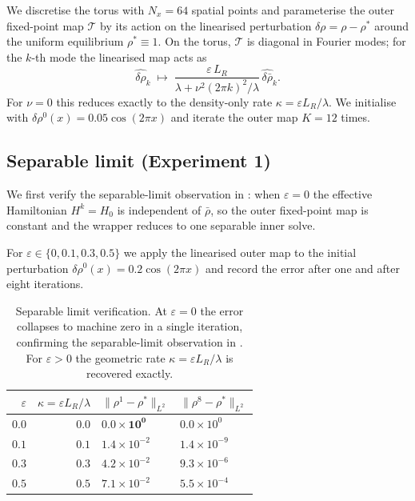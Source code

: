 We discretise the torus with $N_x = 64$ spatial points and parameterise the
outer fixed-point map $\mathcal{T}$ by its action on the linearised
perturbation $\delta\rho = \rho - \rho^*$ around the uniform equilibrium
$\rho^* \equiv 1$.
On the torus, $\mathcal{T}$ is diagonal in Fourier modes; for the $k$-th
mode the linearised map acts as
\[
  \widehat{\delta\rho}_k \;\longmapsto\;
  \frac{\varepsilon\, L_R}{\lambda + \nu^2 (2\pi k)^2/\lambda}\,
  \widehat{\delta\bar\rho}_k.
\]
For $\nu = 0$ this reduces exactly to the density-only rate
$\kappa = \varepsilon L_R/\lambda$.
We initialise with $\delta\rho^0(x) = 0.05\cos(2\pi x)$ and iterate
the outer map $K=12$ times.

\subsection{Separable limit (Experiment 1)}

We first verify the separable-limit observation in : when
$\varepsilon = 0$ the effective Hamiltonian $H^k = H_0$ is independent
of $\bar\rho$, so the outer fixed-point map is constant and the wrapper
reduces to one separable inner solve.

For $\varepsilon \in \{0, 0.1, 0.3, 0.5\}$ we apply the linearised outer
map to the initial perturbation $\delta\rho^0(x) = 0.2\cos(2\pi x)$
and record the error after one and after eight iterations.

\begin{table}[h]
\centering
\begin{tabular}{rrll}
\toprule
$\varepsilon$ & $\kappa = \varepsilon L_R/\lambda$ &
$\|\rho^1-\rho^*\|_{L^2}$ & $\|\rho^8-\rho^*\|_{L^2}$ \\
\midrule
$0.0$ & $0.0$ & $\mathbf{0.0\times 10^0}$ & $0.0\times 10^0$ \\
$0.1$ & $0.1$ & $1.4\times 10^{-2}$        & $1.4\times 10^{-9}$ \\
$0.3$ & $0.3$ & $4.2\times 10^{-2}$        & $9.3\times 10^{-6}$ \\
$0.5$ & $0.5$ & $7.1\times 10^{-2}$        & $5.5\times 10^{-4}$ \\
\bottomrule
\end{tabular}
\caption{Separable limit verification.  At $\varepsilon = 0$ the error
collapses to machine zero in a single iteration, confirming
the separable-limit observation in .  For $\varepsilon > 0$ the geometric rate
$\kappa = \varepsilon L_R/\lambda$ is recovered exactly.}
\label{tab:separable_limit}
\end{table}

